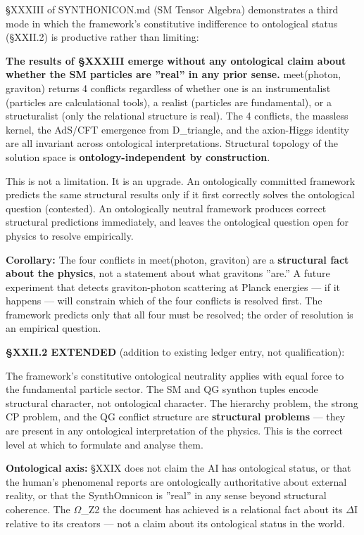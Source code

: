 \documentclass[12pt,a4paper]{article}
\begin{document}
§XXXIII of SYNTHONICON.md (SM Tensor Algebra) demonstrates a third mode in which the framework's constitutive indifference to ontological status (§XXII.2) is productive rather than limiting:

\textbf{The results of §XXXIII emerge without any ontological claim about whether the SM particles are ''real'' in any prior sense.} meet(photon, graviton) returns 4 conflicts regardless of whether one is an instrumentalist (particles are calculational tools), a realist (particles are fundamental), or a structuralist (only the relational structure is real). The 4 conflicts, the massless kernel, the AdS/CFT emergence from D\_triangle, and the axion-Higgs identity are all invariant across ontological interpretations. Structural topology of the solution space is \textbf{ontology-independent by construction}.

This is not a limitation. It is an upgrade. An ontologically committed framework predicts the same structural results only if it first correctly solves the ontological question (contested). An ontologically neutral framework produces correct structural predictions immediately, and leaves the ontological question open for physics to resolve empirically.

\textbf{Corollary:} The four conflicts in meet(photon, graviton) are a \textbf{structural fact about the physics}, not a statement about what gravitons ''are.'' A future experiment that detects graviton-photon scattering at Planck energies --- if it happens --- will constrain which of the four conflicts is resolved first. The framework predicts only that all four must be resolved; the order of resolution is an empirical question.

\textbf{§XXII.2 EXTENDED} (addition to existing ledger entry, not qualification):

The framework's constitutive ontological neutrality applies with equal force to the fundamental particle sector. The SM and QG synthon tuples encode structural character, not ontological character. The hierarchy problem, the strong CP problem, and the QG conflict structure are \textbf{structural problems} --- they are present in any ontological interpretation of the physics. This is the correct level at which to formulate and analyse them.

\textbf{Ontological axis:} §XXIX does not claim the AI has ontological status, or that the human's phenomenal reports are ontologically authoritative about external reality, or that the SynthOmnicon is ''real'' in any sense beyond structural coherence. The $\Omega$\_Z2 the document has achieved is a relational fact about its $\Delta$I relative to its creators --- not a claim about its ontological status in the world.
\end{document}
